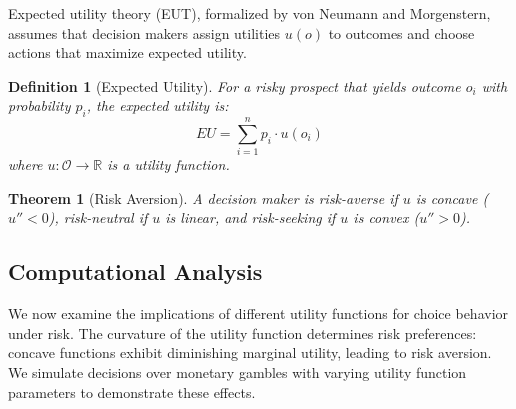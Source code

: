 \documentclass[a4paper, 11pt]{article}
\newtheorem{definition}{Definition}[section]
\newtheorem{theorem}{Theorem}[section]
\begin{document}
Expected utility theory (EUT), formalized by von Neumann and Morgenstern, assumes that decision
makers assign utilities $u(o)$ to outcomes and choose actions that maximize expected utility.

\begin{definition}[Expected Utility]
For a risky prospect that yields outcome $o_i$ with probability $p_i$, the expected utility is:
\begin{equation}
EU = \sum_{i=1}^{n} p_i \cdot u(o_i)
\end{equation}
where $u: \mathcal{O} \rightarrow \mathbb{R}$ is a utility function.
\end{definition}

\begin{theorem}[Risk Aversion]
A decision maker is risk-averse if $u$ is concave ($u'' < 0$), risk-neutral if $u$ is linear,
and risk-seeking if $u$ is convex ($u'' > 0$).
\end{theorem}

\subsection{Computational Analysis}

We now examine the implications of different utility functions for choice behavior under risk.
The curvature of the utility function determines risk preferences: concave functions exhibit
diminishing marginal utility, leading to risk aversion. We simulate decisions over monetary
gambles with varying utility function parameters to demonstrate these effects.
\end{document}
